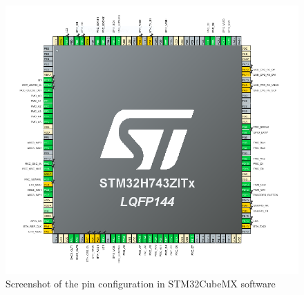 \documentclass[a4paper,twoside,12pt]{book}
\begin{document}
\begin{figure}[H]
    \centering
    \includegraphics[width=\textwidth]{images/pin_overview}
    \caption{Screenshot of the pin configuration in STM32CubeMX software}
    \label{fig:pins}
\end{figure}
\end{document}
